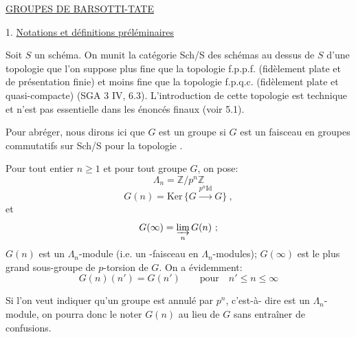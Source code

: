 
\uline{GROUPES DE BARSOTTI-TATE}

1. \uline{Notations et définitions préléminaires}

Soit $S$ un schéma. On munit la catégorie Sch/S des schémas
au dessus de $S$ d'une topologie  que l'on suppose plus fine que la
topologie f.p.p.f. (fidèlement plate et de présentation finie) et moins
fine que la topologie f.p.q.c. (fidèlement plate et quasi-compacte)
(SGA 3 IV, 6.3). L'introduction de cette topologie est technique et n'est
pas essentielle dans les énoncés finaux (voir 5.1).

Pour abréger, nous dirons ici que $G$ est un groupe si $G$ est
un faisceau en groupes commutatifs sur Sch/S pour la topologie .

Pour tout entier $n \geq 1$ et pour tout groupe $G$, on pose:
\[ \Lambda_n = \mathbb{Z}/p^n\mathbb{Z} \]
\[ G(n) = \mathrm{Ker}\,\{G \xrightarrow{p^n \mathrm{Id}} G\} \ , \]
et
\[ G(\infty) = \varinjlim_{n} G(n) \ ; \]
$G(n)$ est un $\Lambda_n$-module (i.e. un -faisceau en $\Lambda_n$-modules);
$G(\infty)$ est le plus grand sous-groupe de $p$-torsion de $G$. On a évidemment:
\[ G(n)(n') = G(n') \qquad \text{pour} \quad n' \leq n \leq \infty \]

Si l'on veut indiquer qu'un groupe est annulé par $p^n$, c'est-à-%
dire est un $\Lambda_n$-module, on pourra donc le noter $G(n)$ au lieu de $G$ sans
entraîner de confusions.

